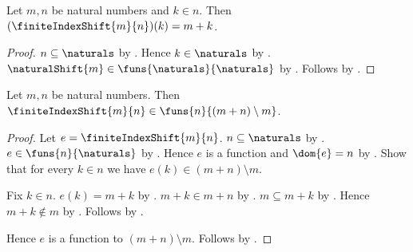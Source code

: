 \begin{proposition}\label{finite_index_shift_apply}
    Let $m,n$ be natural numbers and $k\in n$.
    Then $(\finiteIndexShift{m}{n})(k)=m+k$.
\end{proposition}
\begin{proof}
    $n\subseteq\naturals$ by .
    Hence $k\in\naturals$ by .
    $\naturalShift{m}\in\funs{\naturals}{\naturals}$ by .
    Follows by .
\end{proof}

\begin{theorem}\label{finite_index_shift_type}
    Let $m,n$ be natural numbers.
    Then $\finiteIndexShift{m}{n}\in\funs{n}{(m+n)\setminus m}$.
\end{theorem}
\begin{proof}
    Let $e=\finiteIndexShift{m}{n}$.
    $n\subseteq\naturals$ by .
    $e\in\funs{n}{\naturals}$ by .
    Hence $e$ is a function and $\dom{e}=n$ by .
    Show that for every $k\in n$ we have $e(k)\in(m+n)\setminus m$.
    \begin{subproof}
        Fix $k\in n$.
        $e(k)=m+k$ by .
        $m+k\in m+n$ by .
        $m\subseteq m+k$ by .
        Hence $m+k\notin m$ by .
        Follows by .
    \end{subproof}
    Hence $e$ is a function to $(m+n)\setminus m$.
    Follows by .
\end{proof}

